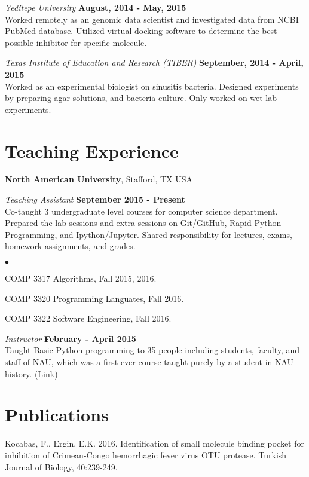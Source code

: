 \documentclass[margin,line]{res}
\newenvironment{list2}{
  \begin{list}{$\bullet$}{%
      \setlength{\itemsep}{0in}
      \setlength{\parsep}{0in} \setlength{\parskip}{0in}
      \setlength{\topsep}{0in} \setlength{\partopsep}{0in} 
      \setlength{\leftmargin}{0.2in}}}{\end{list}}
\begin{document}
\begin{resume}
{\em Yeditepe University} \hfill {\bf August, 2014 - May, 2015}\\
Worked remotely as an genomic data scientist and investigated data from NCBI PubMed database. Utilized virtual docking software to determine the best possible inhibitor for specific molecule.  

{\em Texas Institute of Education and Research (TIBER)} \hfill {\bf September, 2014 - April, 2015}\\
Worked as an experimental biologist on sinusitis bacteria. 
Designed experiments by preparing agar solutions, and bacteria culture.
Only worked on wet-lab experiments.


\section{\sc Teaching Experience}
{\bf North American University}, Stafford, TX USA

\vspace{-.3cm}
{\em Teaching Assistant} \hfill {\bf September 2015 - Present}\\
Co-taught 3 undergraduate level courses for computer science department. Prepared the lab sessions and extra sessions on Git/GitHub, Rapid Python Programming, and Ipython/Jupyter. Shared responsibility for lectures, exams, homework assignments, and  grades.
\vspace*{.05in}  
\begin{list2}
\item COMP 3317 Algorithms, Fall 2015, 2016.
\item COMP 3320 Programming Languates, Fall 2016.
\item COMP 3322 Software Engineering, Fall 2016.
\end{list2}

\vspace{-.3cm}
{\em Instructor} \hfill {\bf February - April 2015}\\
Taught Basic Python programming to 35 people including students, faculty, and staff of NAU, which was a first ever course taught purely by a student in NAU history. (\href{https://github.com/NAU-Python-Class/Py101-Spring-15}{Link})


\section{\sc Publications}
Kocabas, F., Ergin, E.K. 2016. Identification of small molecule binding pocket for inhibition of Crimean-Congo hemorrhagic fever virus OTU protease. Turkish Journal of Biology, 40:239-249.




\end{resume}
\end{document}

